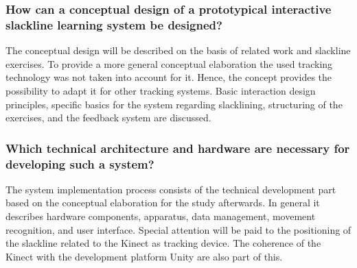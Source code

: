 \subsubsection{How can a conceptual design of a prototypical interactive slackline learning system be designed?}\label{rq_concept}
The conceptual design will be described on the basis of related work and slackline exercises.
To provide a more general conceptual elaboration the used tracking technology was not taken into account for it.
Hence, the concept provides the possibility to adapt it for other tracking systems.
Basic interaction design principles, specific basics for the system regarding slacklining, structuring of the exercises, and the feedback system are discussed.

\subsubsection{Which technical architecture and hardware are necessary for developing such a system?}\label{rq_development}
The system implementation process consists of the technical development part based on the conceptual elaboration for the study afterwards.
In general it describes hardware components, apparatus, data management, movement recognition, and user interface.
Special attention will be paid to the positioning of the slackline related to the Kinect as tracking device.
The coherence of the Kinect with the development platform Unity are also part of this.

